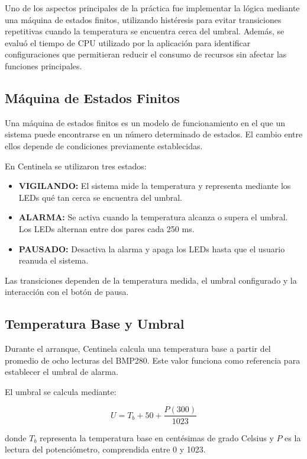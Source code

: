 \documentclass[conference]{IEEEtran}
\begin{document}
Uno de los aspectos principales de la práctica fue implementar la lógica mediante una máquina de estados finitos, utilizando histéresis para evitar transiciones repetitivas cuando la temperatura se encuentra cerca del umbral. Además, se evaluó el tiempo de CPU utilizado por la aplicación para identificar configuraciones que permitieran reducir el consumo de recursos sin afectar las funciones principales.

\subsection{Máquina de Estados Finitos}

Una máquina de estados finitos es un modelo de funcionamiento en el que un sistema puede encontrarse en un número determinado de estados. El cambio entre ellos depende de condiciones previamente establecidas.

En Centinela se utilizaron tres estados:

\begin{itemize}
    \item \textbf{VIGILANDO:} El sistema mide la temperatura y representa mediante los LEDs qué tan cerca se encuentra del umbral.
    \item \textbf{ALARMA:} Se activa cuando la temperatura alcanza o supera el umbral. Los LEDs alternan entre dos pares cada 250 ms.
    \item \textbf{PAUSADO:} Desactiva la alarma y apaga los LEDs hasta que el usuario reanuda el sistema.
\end{itemize}

Las transiciones dependen de la temperatura medida, el umbral configurado y la interacción con el botón de pausa.

\subsection{Temperatura Base y Umbral}

Durante el arranque, Centinela calcula una temperatura base a partir del promedio de ocho lecturas del BMP280. Este valor funciona como referencia para establecer el umbral de alarma.

El umbral se calcula mediante:

\begin{equation}
U = T_b + 50 + \frac{P(300)}{1023}
\end{equation}

donde $T_b$ representa la temperatura base en centésimas de grado Celsius y $P$ es la lectura del potenciómetro, comprendida entre 0 y 1023.
\end{document}
